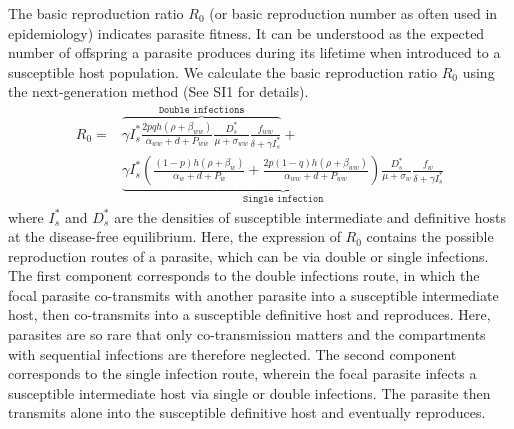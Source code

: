 \documentclass[a4paper]{scrartcl}
\begin{document}
The basic reproduction ratio $R_0$ (or basic reproduction number as often used in epidemiology) indicates parasite fitness. 
It can be understood as the expected number of offspring a parasite produces during its lifetime when introduced to a susceptible host population. 
We calculate the basic reproduction ratio $R_0$ using the next-generation method \citep{Diekmann1990, Diekmann2009, hurford:JRSI:2010} (See SI1 for details).
%
\begin{align}
R_0 = & \overbrace{\gamma I_s^* \frac{2 p q h (\rho +  \beta_{ww})}{\alpha_{ww} + d + P_{ww}} \frac{D_s^*}{\mu +\sigma_{ww}} \frac{f_{ww}}{\delta +\gamma I_s^*}}^{ \texttt{Double infections}} + \nonumber \\
& \underbrace{\gamma  I_s^* \left( \frac{ (1-p) h (\rho + \beta_w)}{\alpha_w + d + P_w} + \frac{2 p (1-q) h (\rho + \beta_{ww})}{\alpha_{ww} + d + P_{ww}} \right) \frac{D_s^*}{\mu + \sigma_w} \frac{f_w}{\delta +\gamma  I_s^*}}_{\texttt{Single infection}}
\end{align}
%
where $I_s^*$ and $D_s^*$ are the densities of susceptible intermediate and definitive hosts at the disease-free equilibrium. 
Here, the expression of $R_0$ contains the possible reproduction routes of a parasite, which can be via double or single infections. 
The first component corresponds to the double infections route, in which the focal parasite co-transmits with another parasite into a susceptible intermediate host, then co-transmits into a susceptible definitive host and reproduces. 
Here, parasites are so rare that only co-transmission matters and the compartments with sequential infections are therefore neglected. 
The second component corresponds to the single infection route, wherein the focal parasite infects a susceptible intermediate host via single or double infections. 
The parasite then transmits alone into the susceptible definitive host and eventually reproduces. 
\end{document}
